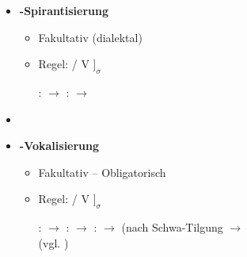\begin{frame}

\begin{itemize}
	\item \textbf{-Spirantisierung}

	\begin{itemize}
		\item Fakultativ (dialektal)
		\item Regel:  \ras {} / V\underline{\quad} $]_\sigma$

\eal	
	\ex {}:  $\rightarrow$ \textipa{[za:xst]}
	\ex {}:  $\rightarrow$ \textipa{[f{\textscr}\t{ɔɪ}.dI\c{c}]}
\zl

	\end{itemize}

	\item[]
	\item \textbf{\textipa{/{\textscr}/}-Vokalisierung}
	
	\begin{itemize}
		\item Fakultativ -- Obligatorisch
		\item Regel: \textipa{/{\textscr}/} \ras \textipa{[5]} / V\underline{\quad} $]_\sigma$

	\eal
		\ex {}:  $\rightarrow$ \textipa{[Po:5]}
		\ex {}:  $\rightarrow$ \textipa{[fE5n]}
		\ex {}:  $\rightarrow$ \textipa{[le:.{\textscr}@5]} (nach Schwa-Tilgung $\rightarrow$ \textipa{[le:.{\textscr}5]}\\
		(vgl. )
	\zl
	
	\end{itemize}

\end{itemize}

\end{frame}


